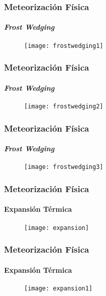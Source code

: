 \documentclass{beamer}
\begin{document}
\begin{frame}
\frametitle{Meteorización Física}
\framesubtitle{\emph{Frost Wedging}}
\begin{figure}
\begin{center}
   	\texttt{[image: frostwedging1]}
\end{center}
\end{figure}
\end{frame}
\begin{frame}
\frametitle{Meteorización Física}
\framesubtitle{\emph{Frost Wedging}}
\begin{figure}
\begin{center}
   	\texttt{[image: frostwedging2]}
\end{center}
\end{figure}
\end{frame}
\begin{frame}
\frametitle{Meteorización Física}
\framesubtitle{\emph{Frost Wedging}}
\begin{figure}
\begin{center}
   	\texttt{[image: frostwedging3]}
\end{center}
\end{figure}
\end{frame}
\begin{frame}
\frametitle{Meteorización Física}
\framesubtitle{Expansión Térmica}
\begin{figure}
\begin{center}
   	\texttt{[image: expansion]}
\end{center}
\end{figure}
\end{frame}
\begin{frame}
\frametitle{Meteorización Física}
\framesubtitle{Expansión Térmica}
\begin{figure}
\begin{center}
   	\texttt{[image: expansion1]}
\end{center}
\end{figure}
\end{frame}
\end{document}
